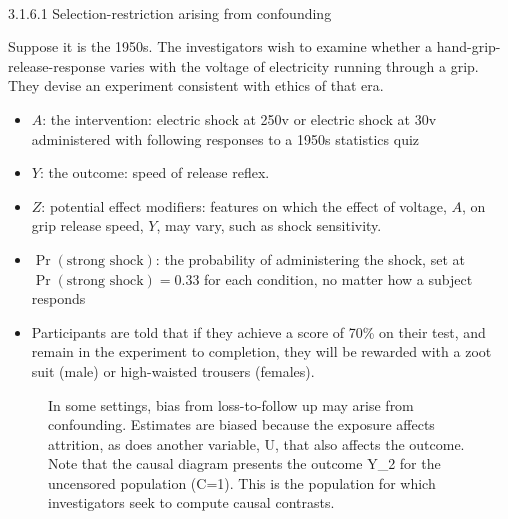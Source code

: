 \documentclass[
  singlecolumn]{article}
\makeatletter
\let\oldparagraph\paragraph
\renewcommand{\paragraph}{
    \@ifstar
      \xxxParagraphStar
      \xxxParagraphNoStar
  }
\newcommand{\xxxParagraphStar}[1]{\oldparagraph*{#1}\mbox{}}
\newcommand{\xxxParagraphNoStar}[1]{\oldparagraph{#1}\mbox{}}
\providecommand{\tightlist}{%
  \setlength{\itemsep}{0pt}\setlength{\parskip}{0pt}}\usepackage{longtable,booktabs,array}
\makeatother
\begin{document}
\paragraph{3.1.6.1 Selection-restriction arising from
confounding}\label{selection-restriction-arising-from-confounding}

Suppose it is the 1950s. The investigators wish to examine whether a
hand-grip-release-response varies with the voltage of electricity
running through a grip. They devise an experiment consistent with ethics
of that era.

\begin{itemize}
\tightlist
\item
  \(A\): the intervention: electric shock at 250v or electric shock at
  30v administered with following responses to a 1950s statistics quiz
\item
  \(Y\): the outcome: speed of release reflex.
\item
  \(Z\): potential effect modifiers: features on which the effect of
  voltage, \(A\), on grip release speed, \(Y\), may vary, such as shock
  sensitivity.
\item
  \(\Pr(\text{strong shock})\): the probability of administering the
  shock, set at \(\Pr(\text{strong shock})= 0.33\) for each condition,
  no matter how a subject responds
\item
  Participants are told that if they achieve a score of 70\% on their
  test, and remain in the experiment to completion, they will be
  rewarded with a zoot suit (male) or high-waisted trousers (females).
\end{itemize}

\begin{figure}


\caption{\label{fig-experiment-selection-collider-adjustment}In some
settings, bias from loss-to-follow up may arise from confounding.
Estimates are biased because the exposure affects attrition, as does
another variable, U, that also affects the outcome. Note that the causal
diagram presents the outcome Y\_2 for the uncensored population (C=1).
This is the population for which investigators seek to compute causal
contrasts.}

\end{figure}%
\end{document}
